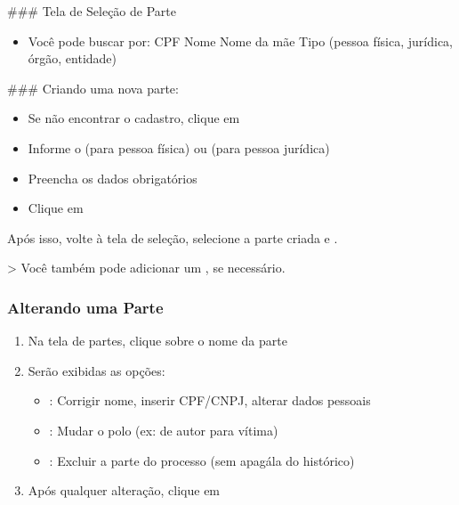 \documentclass[letterpaper,10pt,brazil]{sphinxmanual}
\begin{document}
\sphinxAtStartPar
\#\#\# Tela de Seleção de Parte
\begin{itemize}
\item {} 
\sphinxAtStartPar
Você pode buscar por:
\sphinxhyphen{} CPF
\sphinxhyphen{} Nome
\sphinxhyphen{} Nome da mãe
\sphinxhyphen{} Tipo (pessoa física, jurídica, órgão, entidade)

\end{itemize}

\sphinxAtStartPar
\#\#\# Criando uma nova parte:
\begin{itemize}
\item {} 
\sphinxAtStartPar
Se não encontrar o cadastro, clique em 

\item {} 
\sphinxAtStartPar
Informe o  (para pessoa física) ou  (para pessoa jurídica)

\item {} 
\sphinxAtStartPar
Preencha os dados obrigatórios

\item {} 
\sphinxAtStartPar
Clique em 

\end{itemize}

\sphinxAtStartPar
Após isso, volte à tela de seleção, selecione a parte criada e .

\sphinxAtStartPar
\textgreater{} Você também pode adicionar um , se necessário.


\subsubsection{Alterando uma Parte}
\label{\detokenize{projud_23_cadastroparte:alterando-uma-parte}}\begin{enumerate}
%
\item {} 
\sphinxAtStartPar
Na tela de partes, clique sobre o nome da parte

\item {} 
\sphinxAtStartPar
Serão exibidas as opções:
\begin{itemize}
\item {} 
\sphinxAtStartPar
{}: Corrigir nome, inserir CPF/CNPJ, alterar dados pessoais

\item {} 
\sphinxAtStartPar
{}: Mudar o polo (ex: de autor para vítima)

\item {} 
\sphinxAtStartPar
{}: Excluir a parte do processo (sem apagá\sphinxhyphen{}la do histórico)

\end{itemize}

\item {} 
\sphinxAtStartPar
Após qualquer alteração, clique em 

\end{enumerate}
\end{document}

